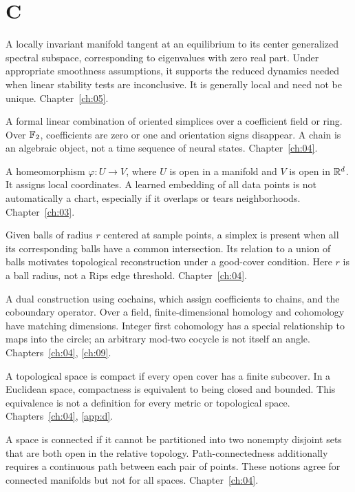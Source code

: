 \section*{C}
\begin{description}[style=nextline]
\item[Center manifold.] A locally invariant manifold tangent at an equilibrium to its center generalized spectral subspace, corresponding to eigenvalues with zero real part. Under appropriate smoothness assumptions, it supports the reduced dynamics needed when linear stability tests are inconclusive. It is generally local and need not be unique. Chapter~\ref{ch:05}.
\item[Chain.] A formal linear combination of oriented simplices over a coefficient field or ring. Over $\mathbb{F}_2$, coefficients are zero or one and orientation signs disappear. A chain is an algebraic object, not a time sequence of neural states. Chapter~\ref{ch:04}.
\item[Chart.] A homeomorphism $\varphi:U\to V$, where $U$ is open in a manifold and $V$ is open in $\mathbb{R}^d$. It assigns local coordinates. A learned embedding of all data points is not automatically a chart, especially if it overlaps or tears neighborhoods. Chapter~\ref{ch:03}.
\item[\v{C}ech complex.] Given balls of radius $r$ centered at sample points, a simplex is present when all its corresponding balls have a common intersection. Its relation to a union of balls motivates topological reconstruction under a good-cover condition. Here $r$ is a ball radius, not a Rips edge threshold. Chapter~\ref{ch:04}.
\item[Cohomology.] A dual construction using cochains, which assign coefficients to chains, and the coboundary operator. Over a field, finite-dimensional homology and cohomology have matching dimensions. Integer first cohomology has a special relationship to maps into the circle; an arbitrary mod-two cocycle is not itself an angle. Chapters~\ref{ch:04}, \ref{ch:09}.
\item[Compactness.] A topological space is compact if every open cover has a finite subcover. In a Euclidean space, compactness is equivalent to being closed and bounded. This equivalence is not a definition for every metric or topological space. Chapters~\ref{ch:04}, \ref{app:d}.
\item[Connectedness.] A space is connected if it cannot be partitioned into two nonempty disjoint sets that are both open in the relative topology. Path-connectedness additionally requires a continuous path between each pair of points. These notions agree for connected manifolds but not for all spaces. Chapter~\ref{ch:04}.

\end{description}
